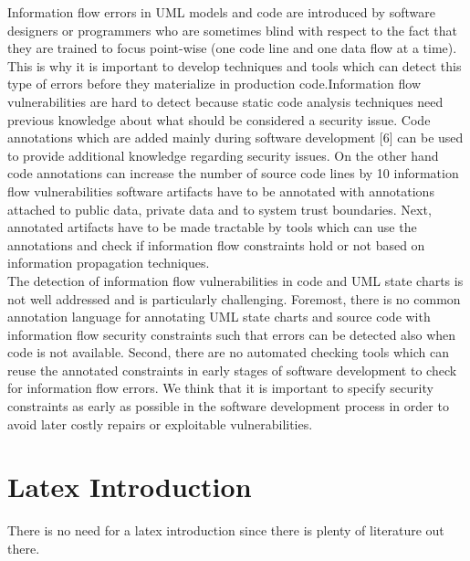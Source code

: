 Information flow errors in UML models
and code are introduced by software designers or programmers
who are sometimes blind with respect to the fact that they
are trained to focus point-wise (one code line and one data flow
at a time). This is why it is important to develop techniques
and tools which can detect this type of errors before they
materialize in production code.Information flow vulnerabilities are hard to detect because static code analysis techniques need previous knowledge about what should be considered a security issue. Code annotations which are added mainly during software development [6] can be used to provide additional knowledge regarding security
issues. On the other hand code annotations can increase the
number of source code lines by 10%
information flow vulnerabilities software artifacts have to be
annotated with annotations attached to public data, private data and to system trust boundaries. Next, annotated artifacts have
to be made tractable by tools which can use the annotations
and check if information flow constraints hold or not based on
information propagation techniques.\\

The detection of information flow vulnerabilities in code
and UML state charts is not well addressed and is particularly
challenging. Foremost, there is no common annotation language for annotating UML state charts and source code with
information flow security constraints such that errors can be
detected also when code is not available. Second, there are
no automated checking tools which can reuse the annotated
constraints in early stages of software development to check
for information flow errors. We think that it is important to
specify security constraints as early as possible in the software
development process in order to avoid later costly repairs or
exploitable vulnerabilities.
 
\section{Latex Introduction}
There is no need for a latex introduction since there is plenty of literature out there.
 


